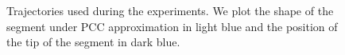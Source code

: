 \begin{figure}[hbt]
  \caption{Trajectories used during the experiments. We plot the shape of the segment under PCC approximation in light blue and the position of the tip of the segment in dark blue. 
  }
  \label{fig:promasens:trajectories}
\end{figure}

